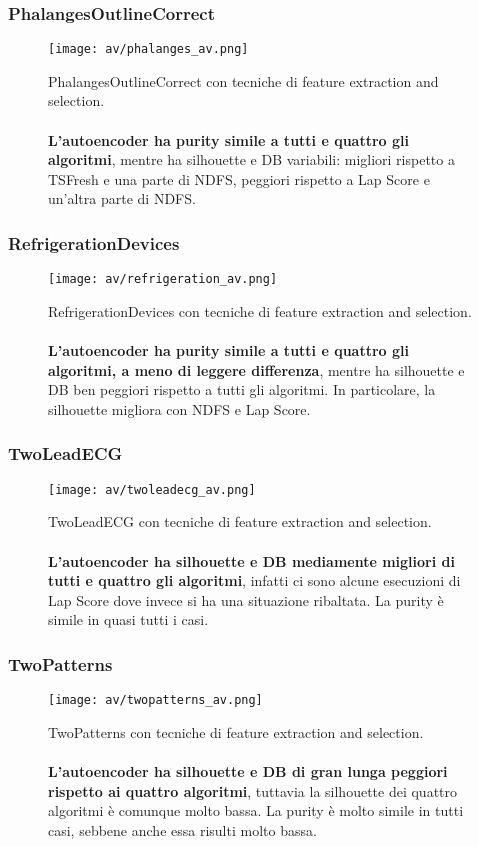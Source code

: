 \subsubsection{PhalangesOutlineCorrect}
\begin{figure}[H]
	\centering
	\texttt{[image: av/phalanges\_av.png]}
	\caption{PhalangesOutlineCorrect con tecniche di feature extraction and selection.\\
	\\
	\textbf{L'autoencoder ha purity simile a tutti e quattro gli algoritmi}, mentre ha silhouette e DB variabili: migliori rispetto a TSFresh e una parte di NDFS, peggiori rispetto a Lap Score e un'altra parte di NDFS.}
	\label{fig:phalanges_av}
\end{figure}

\subsubsection{RefrigerationDevices}
\begin{figure}[H]
	\centering
	\texttt{[image: av/refrigeration\_av.png]}
	\caption{RefrigerationDevices con tecniche di feature extraction and selection.\\
	\\
	\textbf{L'autoencoder ha purity simile a tutti e quattro gli algoritmi, a meno di leggere differenza}, mentre ha silhouette e DB ben peggiori rispetto a tutti gli algoritmi. In particolare, la silhouette migliora con NDFS e Lap Score.}
	\label{fig:refrigeration_av}
\end{figure}

\subsubsection{TwoLeadECG}
\begin{figure}[H]
	\centering
	\texttt{[image: av/twoleadecg\_av.png]}
	\caption{TwoLeadECG con tecniche di feature extraction and selection.\\
	\\
	\textbf{L'autoencoder ha silhouette e DB mediamente migliori di tutti e quattro gli algoritmi}, infatti ci sono alcune esecuzioni di Lap Score dove invece si ha una situazione ribaltata. La purity è simile in quasi tutti i casi.}
	\label{fig:twoleadecg_av}
\end{figure}

\subsubsection{TwoPatterns}
\begin{figure}[H]
	\centering
	\texttt{[image: av/twopatterns\_av.png]}
	\caption{TwoPatterns con tecniche di feature extraction and selection.\\
	\\
	\textbf{L'autoencoder ha silhouette e DB di gran lunga peggiori rispetto ai quattro algoritmi}, tuttavia la silhouette dei quattro algoritmi è comunque molto bassa. La purity è molto simile in tutti casi, sebbene anche essa risulti molto bassa.}
	\label{fig:twopatterns_av}
\end{figure}